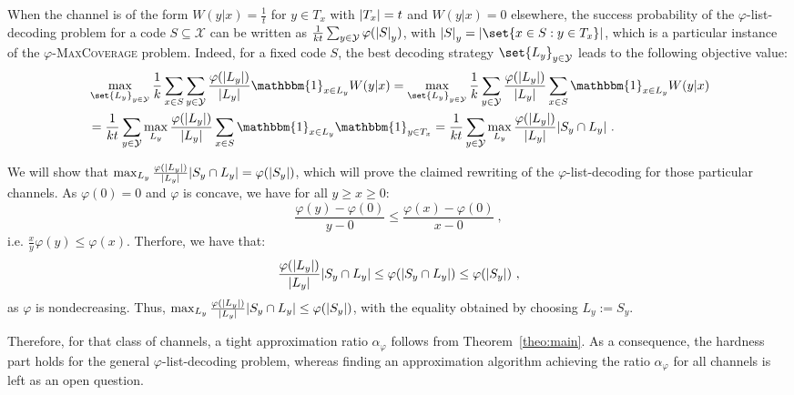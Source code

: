 When the channel is of the form $W(y|x) = \frac{1}{t}$ for $y \in T_x$ with $\abs{T_x}=t$ and $W(y|x) = 0$ elsewhere, the success probability of the $\varphi$-list-decoding problem for a code $S\subseteq \mathcal{X}$ can be written as $\frac{1}{kt}\sum_{y \in \mathcal{Y}}\varphi(\abs{S}_y)$, with $\abs{S}_y = \abs{\set{x \in S : y \in T_x}}$, which is a particular instance of the $\varphi$-\textsc{MaxCoverage} problem. Indeed, for a fixed code $S$, the best decoding strategy $\set{L_y}_{y \in \mathcal{Y}}$ leads to the following objective value:
\begin{equation}
  \begin{aligned}
    &\max_{\set{L_y}_{y \in \mathcal{Y}}}\frac{1}{k}\sum_{x \in S}\sum_{y \in \mathcal{Y}}\frac{\varphi(\abs{L_y})}{\abs{L_y}}\mathbbm{1}_{x \in L_y}W(y|x) = \max_{\set{L_y}_{y \in \mathcal{Y}}}\frac{1}{k}\sum_{y \in \mathcal{Y}}\frac{\varphi(\abs{L_y})}{\abs{L_y}}\sum_{x \in S}\mathbbm{1}_{x \in L_y}W(y|x)\\
    &= \frac{1}{kt}\sum_{y \in \mathcal{Y}}\max_{L_y}\frac{\varphi(\abs{L_y})}{\abs{L_y}}\sum_{x \in S}\mathbbm{1}_{x \in L_y}\mathbbm{1}_{y \in T_x} = \frac{1}{kt}\sum_{y \in \mathcal{Y}}\max_{L_y}\frac{\varphi(\abs{L_y})}{\abs{L_y}}\abs{S_y \cap L_y} \ .
    \end{aligned}
\end{equation}

We will show that $\max_{L_y}\frac{\varphi(\abs{L_y})}{\abs{L_y}}\abs{S_y \cap L_y} = \varphi(\abs{S_y})$, which will prove the claimed rewriting of the $\varphi$-list-decoding for those particular channels. As $\varphi(0)=0$ and $\varphi$ is concave, we have for all $y \geq x \geq 0$:
\[ \frac{\varphi(y) - \varphi(0)}{y-0} \leq \frac{\varphi(x) - \varphi(0)}{x-0}  \ , \]
i.e. $\frac{x}{y}\varphi(y) \leq \varphi(x)$. Therfore, we have that:
\[ \frac{\varphi(\abs{L_y})}{\abs{L_y}}\abs{S_y \cap L_y} \leq \varphi(\abs{S_y \cap L_y}) \leq \varphi(\abs{S_y}) \ , \]
as $\varphi$ is nondecreasing. Thus, $\max_{L_y}\frac{\varphi(\abs{L_y})}{\abs{L_y}}\abs{S_y \cap L_y} \leq \varphi(\abs{S_y})$, with the equality obtained by choosing $L_y := S_y$.

Therefore, for that class of channels, a tight approximation ratio $\alpha_{\varphi}$ follows from Theorem~\ref{theo:main}. As a consequence, the hardness part holds for the general $\varphi$-list-decoding problem, whereas finding an approximation algorithm achieving the ratio $\alpha_{\varphi}$ for all channels is left as an open question.
  
